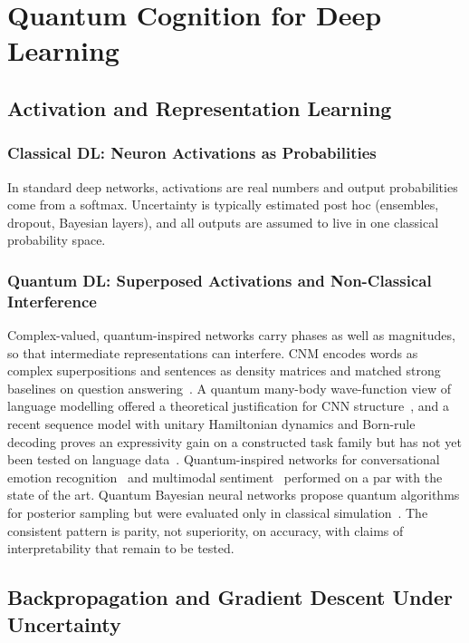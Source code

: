\documentclass[pdflatex,sn-basic]{sn-jnl}
\begin{document}
\section{Quantum Cognition for Deep Learning}\label{sec:dl}

\subsection{Activation and Representation Learning}

\subsubsection{Classical DL: Neuron Activations as Probabilities}
In standard deep networks, activations are real numbers and output probabilities come from a softmax. Uncertainty is typically estimated post hoc (ensembles, dropout, Bayesian layers), and all outputs are assumed to live in one classical probability space.

\subsubsection{Quantum DL: Superposed Activations and Non-Classical Interference}
Complex-valued, quantum-inspired networks carry phases as well as magnitudes, so that intermediate representations can interfere. CNM encodes words as complex superpositions and sentences as density matrices and matched strong baselines on question answering~\citep{Li2019}. A quantum many-body wave-function view of language modelling offered a theoretical justification for CNN structure~\citep{Zhang2018}, and a recent sequence model with unitary Hamiltonian dynamics and Born-rule decoding proves an expressivity gain on a constructed task family but has not yet been tested on language data~\citep{Nebli2026}. Quantum-inspired networks for conversational emotion recognition~\citep{Li2021b} and multimodal sentiment~\citep{Li2021a} performed on a par with the state of the art. Quantum Bayesian neural networks propose quantum algorithms for posterior sampling but were evaluated only in classical simulation~\citep{Berner2021}. The consistent pattern is parity, not superiority, on accuracy, with claims of interpretability that remain to be tested.

\subsection{Backpropagation and Gradient Descent Under Uncertainty}
\end{document}
